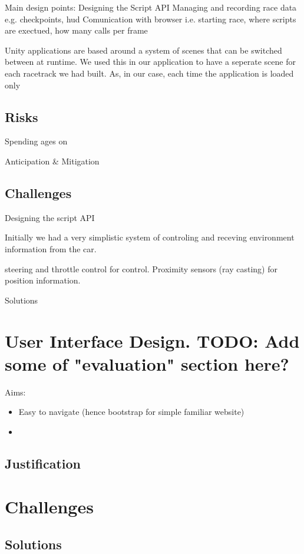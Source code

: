 Main design points:
Designing the Script API
Managing and recording race data e.g. checkpoints, hud
Comunication with browser i.e. starting race, where scripts are exectued, how many calls per frame

Unity applications are based around a system of scenes that can be switched between at runtime. We used this in our application to have a seperate scene for each racetrack we had built. As, in our case, each time the application is loaded only 

\subsection{Risks}
Spending ages on 

Anticipation \& Mitigation

\subsection{Challenges}
Designing the script API

Initially we had a very simplistic system of controling and receving environment information from the car. 

steering and throttle control for control. Proximity sensors (ray casting) for position information. 

Solutions

\section{User Interface Design. TODO: Add some of "evaluation" section here?}
Aims:
\begin{itemize}
\item Easy to navigate (hence bootstrap for simple familiar website) 
\item 
\end{itemize}



\subsection{Justification}



\section{Challenges}
\subsection{Solutions}


